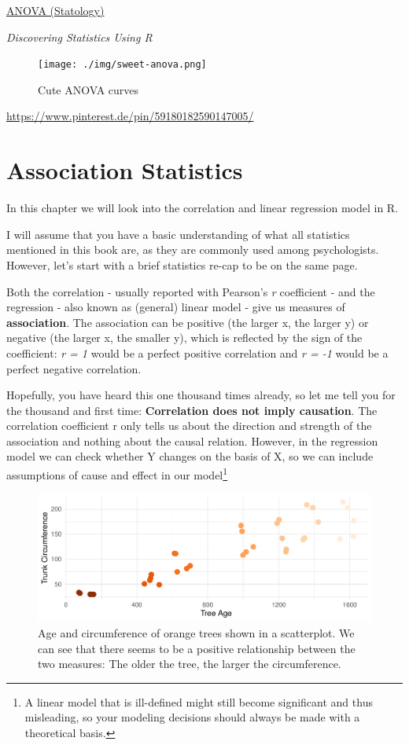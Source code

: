 \documentclass[
]{book}
\begin{document}
\href{https://www.statology.org/interpret-anova-results-in-r/}{ANOVA (Statology)}

\emph{Discovering Statistics Using R} \citep{field2012}

\begin{figure}
\centering
\texttt{[image: ./img/sweet-anova.png]}
\caption{Cute ANOVA curves}
\end{figure}

\url{https://www.pinterest.de/pin/59180182590147005/}

\chapter{Association Statistics}\label{association-statistics}

In this chapter we will look into the correlation and linear regression model in R.

I will assume that you have a basic understanding of what all statistics mentioned in this book are, as they are commonly used among psychologists. However, let's start with a brief statistics re-cap to be on the same page.

Both the correlation - usually reported with Pearson's \emph{r} coefficient - and the regression - also known as (general) linear model - give us measures of \textbf{association}.
The association can be positive (the larger x, the larger y) or negative (the larger x, the smaller y), which is reflected by the sign of the coefficient: \emph{r = 1} would be a perfect positive correlation and \emph{r = -1} would be a perfect negative correlation.

Hopefully, you have heard this one thousand times already, so let me tell you for the thousand and first time: \textbf{Correlation does not imply causation}.
The correlation coefficient r only tells us about the direction and strength of the association and nothing about the causal relation.
However, in the regression model we can check whether Y changes on the basis of X, so we can include assumptions of cause and effect in our model\footnote{A linear model that is ill-defined might still become significant and thus misleading, so your modeling decisions should always be made with a theoretical basis.}

\begin{figure}
\centering
\includegraphics{_main_files/figure-html/tree-age-1.pdf}
\caption{\label{fig:tree-age}Age and circumference of orange trees shown in a scatterplot. We can see that there seems to be a positive relationship between the two measures: The older the tree, the larger the circumference.}
\end{figure}
\end{document}
